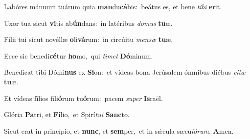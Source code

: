 Labóres mánuum tuárum quia \textbf{man}du\textbf{cá}bis:~\redgreheightstar beátus es, et bene \textit{ti}\textit{bi} \textbf{e}rit.

Uxor tua sicut \textbf{vi}tis ab\textbf{ún}dans:~\redgreheightstar in latéribus \textit{do}\textit{mus} \textbf{tu}æ.

Fílii tui sicut novéllæ \textbf{o}li\textbf{vá}rum:~\redgreheightstar in circúitu \textit{men}\textit{sæ} \textbf{tu}æ.

Ecce sic benedi\textbf{cé}tur \textbf{ho}mo,~\redgreheightstar qui \textit{ti}\textit{met} \textbf{Dó}minum.

Benedícat tibi Dómi\textbf{nus} ex \textbf{Si}on:~\redgreheightstar et vídeas bona Jerúsalem ómnibus diébus \textit{vi}\textit{tæ} \textbf{tu}æ.

Et vídeas fílios fili\textbf{ó}rum tu\textbf{ó}rum:~\redgreheightstar pacem \textit{su}\textit{per} \textbf{Is}raël.

Glória \textbf{Pa}tri, et \textbf{Fí}lio,~\redgreheightstar et Spirí\textit{tu}\textit{i} \textbf{Sanc}to.

Sicut erat in princípio, et \textbf{nunc}, et \textbf{sem}per,~\redgreheightstar et in sǽcula sæcu\textit{ló}\textit{rum}. \textbf{A}men.

